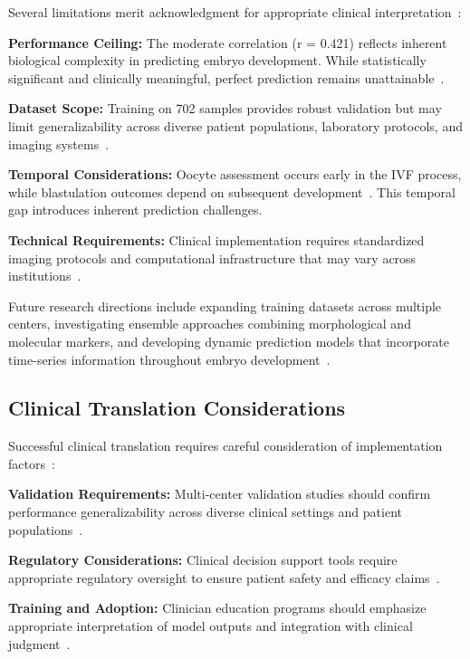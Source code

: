 Several limitations merit acknowledgment for appropriate clinical interpretation~\cite{varoquaux2022machine}:

\textbf{Performance Ceiling:} The moderate correlation (r = 0.421) reflects inherent biological complexity in predicting embryo development. While statistically significant and clinically meaningful, perfect prediction remains unattainable~\cite{rajkomar2019machine}.

\textbf{Dataset Scope:} Training on 702 samples provides robust validation but may limit generalizability across diverse patient populations, laboratory protocols, and imaging systems~\cite{litjens2017survey}.

\textbf{Temporal Considerations:} Oocyte assessment occurs early in the IVF process, while blastulation outcomes depend on subsequent development~\cite{meseguer2011morphokinetics}. This temporal gap introduces inherent prediction challenges.

\textbf{Technical Requirements:} Clinical implementation requires standardized imaging protocols and computational infrastructure that may vary across institutions~\cite{mortimer2015quality}.

Future research directions include expanding training datasets across multiple centers, investigating ensemble approaches combining morphological and molecular markers, and developing dynamic prediction models that incorporate time-series information throughout embryo development~\cite{meseguer2011morphokinetics}.

\subsection{Clinical Translation Considerations}

Successful clinical translation requires careful consideration of implementation factors~\cite{fda2022clinical,rajkomar2019machine}:

\textbf{Validation Requirements:} Multi-center validation studies should confirm performance generalizability across diverse clinical settings and patient populations~\cite{varoquaux2022machine}.

\textbf{Regulatory Considerations:} Clinical decision support tools require appropriate regulatory oversight to ensure patient safety and efficacy claims~\cite{fda2021ai,fda2022clinical}.

\textbf{Training and Adoption:} Clinician education programs should emphasize appropriate interpretation of model outputs and integration with clinical judgment~\cite{topol2019high}.

